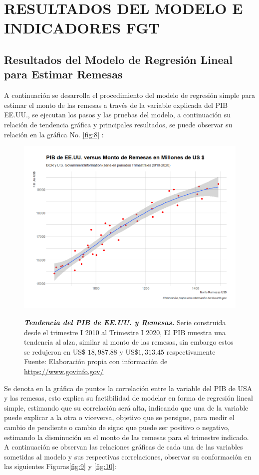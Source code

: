 \section{RESULTADOS DEL MODELO E INDICADORES FGT}
\subsection{Resultados del Modelo de Regresión Lineal para Estimar Remesas}

A continuación se desarrolla el procedimiento del modelo de regresión simple para estimar el monto de las remesas a través de la variable explicada del PIB EE.UU., se ejecutan los pasos y las pruebas del modelo, a continuación su relación de tendencia gráfica y principales resultados, se puede observar su relación en la gráfica No. \eqref{fig:8} :

\begin{figure}[H]
	\centering
	\resizebox{16.5 cm}{!} { 
		\includegraphics[width=1\linewidth]{Imagenes/Grafo_08}}
	\caption{\textbf{\textit{Tendencia del PIB de EE.UU. y Remesas.}}
		{\small Serie construida desde el trimestre I 2010 al Trimestre I 2020, El PIB muestra una tendencia al alza, similar al monto de las remesas, sin embargo estos se redujeron en US\$ $18,987.88$ y US\$$1,313.45$ respectivamente  Fuente: Elaboración propia con información de \href{https://www.govinfo.gov/}{https://www.govinfo.gov/}}
	} 
	\label{fig:8}
	
\end{figure}

Se denota en la gráfica de puntos la correlación entre la variable del PIB de USA y las remesas, esto explica su factibilidad de modelar en forma de regresión lineal simple, estimando que su correlación será alta, indicando que una de la variable puede explicar a la otra o viceversa, objetivo que se persigue, para medir el cambio de pendiente o cambio de signo que puede ser positivo o negativo, estimando la disminución en el monto de las remesas para el trimestre indicado. A continuación se observan las relaciones gráficas de cada una de las variables sometidas al modelo y sus respectivas correlaciones, observar su conformación en las siguientes Figuras\eqref{fig:9} y \eqref{fig:10}:

